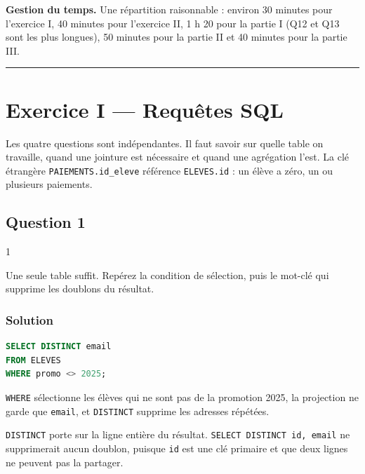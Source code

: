 \documentclass[11pt,a4paper]{article}
\begin{document}
\textbf{Gestion du temps.} Une répartition raisonnable : environ 30 minutes pour l'exercice I, 40 minutes pour l'exercice II, 1 h 20 pour la partie I (Q12 et Q13 sont les plus longues), 50 minutes pour la partie II et 40 minutes pour la partie III.

\begin{center}\rule{0.5\linewidth}{0.5pt}\end{center}

\hypertarget{exercice-i-requuxeates-sql}{%
\section{Exercice I --- Requêtes SQL}\label{exercice-i-requuxeates-sql}}

Les quatre questions sont indépendantes. Il faut savoir sur quelle table on travaille, quand une jointure est nécessaire et quand une agrégation l'est. La clé étrangère \texttt{PAIEMENTS.id\_eleve} référence \texttt{ELEVES.id} : un élève a zéro, un ou plusieurs paiements.

\hypertarget{question-1}{%
\subsection{Question 1}\label{question-1}}

\begin{indication}{1}

Une seule table suffit. Repérez la condition de sélection, puis le mot-clé qui supprime les doublons du résultat.

\end{indication}

\hypertarget{solution}{%
\subsubsection{Solution}\label{solution}}

\begin{lstlisting}[language=SQL]
SELECT DISTINCT email
FROM ELEVES
WHERE promo <> 2025;
\end{lstlisting}

\texttt{WHERE} sélectionne les élèves qui ne sont pas de la promotion 2025, la projection ne garde que \texttt{email}, et \texttt{DISTINCT} supprime les adresses répétées.

\begin{piege}

\texttt{DISTINCT} porte sur la ligne entière du résultat. \texttt{SELECT\ DISTINCT\ id,\allowbreak{}\ email} ne supprimerait aucun doublon, puisque \texttt{id} est une clé primaire et que deux lignes ne peuvent pas la partager.

\end{piege}
\end{document}

